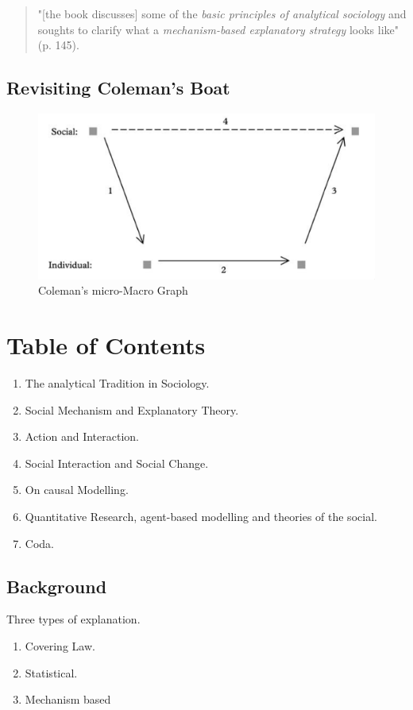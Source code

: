 \documentclass[11pt]{article}
\begin{document}
\begin{quote}
"[the book discusses] some of the \emph{basic principles of analytical sociology} and soughts to clarify what a \emph{mechanism-based explanatory strategy} looks like" (p. 145).
\end{quote}


\subsection*{Revisiting Coleman's Boat}
\label{sec:orga14f32d}
\begin{figure}[htbp]
\centering
\includegraphics[width=.9\linewidth]{boat.png}
\caption{Coleman's micro-Macro Graph}
\end{figure}

\section*{Table of Contents}
\label{sec:org2dad8e6}
\begin{enumerate}
\item The analytical Tradition in Sociology.
\item Social Mechanism and Explanatory Theory.
\item Action and Interaction.
\item Social Interaction and Social Change.
\item On causal Modelling.
\item Quantitative Research, agent-based modelling and theories of the social.
\item Coda.
\end{enumerate}


\subsection*{Background}
\label{sec:orgb227178}
Three types of explanation.

\begin{enumerate}
\item Covering Law.
\item Statistical.
\item Mechanism based
\end{enumerate}
\end{document}
